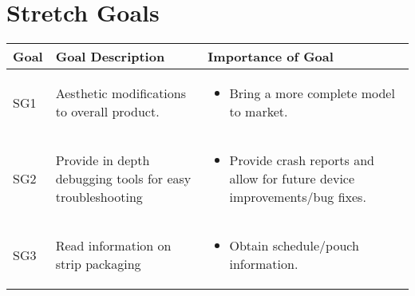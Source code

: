 \documentclass[12pt]{article}
\begin{document}
\section{Stretch Goals}
\begin{center}
\begin{adjustbox}{max width=\textwidth}
\small
\begin{tabular}{|p{}|p{}|p{}|}
 \hline
 \textbf{Goal} & \textbf{Goal Description} & \textbf{Importance of Goal} \\ 
 \hline
 SG1 &
 Aesthetic modifications to overall product. & 
\begin{itemize}[noitemsep,topsep=0pt,leftmargin=13pt]
  \item Bring a more complete model to market.
  \end{itemize}\\ 
 \hline
  SG2 &
 Provide in depth debugging tools for easy troubleshooting & 
\begin{itemize}[noitemsep,topsep=0pt,leftmargin=13pt]
  \item Provide crash reports and allow for future device improvements/bug fixes.
  \end{itemize}\\ 
 \hline
   SG3 &
 Read information on strip packaging & 
\begin{itemize}[noitemsep,topsep=0pt,leftmargin=13pt]
  \item Obtain schedule/pouch information.
  \end{itemize}\\ 
 \hline
\end{tabular}
\end{adjustbox}
\end{center}
\end{document}
